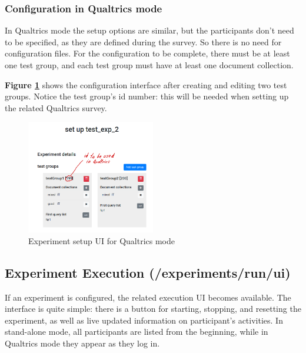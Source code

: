 \documentclass[a4paper]{usiinfbachelorproject}
\begin{document}
\begin{appendices}
        \newpage

        \subsubsection{Configuration in Qualtrics mode}

        In Qualtrics mode the setup options are similar, but the participants don't need to be specified, as they are defined during the survey.
        So there is no need for configuration files. For the configuration to be complete, there must be at least one test group, and each test group
        must have at least one document collection. 

        \textbf{Figure \ref{fig:expSetupUi2}} shows the configuration interface after creating and editing
        two test groups. Notice the test group's id number: this will be needed when setting up the related Qualtrics survey. 

        \begin{figure} [h]
        \centering
        \includegraphics[width=0.5\textwidth]{figures/expSetupUi2}
        \caption[]{Experiment setup UI for Qualtrics mode}
        \label{fig:expSetupUi2}
        \end{figure}

        \subsection{Experiment Execution \small{(/experiments/run/ui)}}

        If an experiment is configured, the related execution UI becomes available. The interface is quite simple: there is a button
        for starting, stopping, and resetting the experiment, as well as live updated information on participant's activities.
        In stand-alone mode, all participants are listed from the beginning, while in Qualtrics mode they appear as they log in.


\end{appendices}
\end{document}
